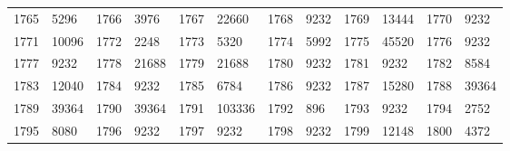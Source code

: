 \begin{longtable}{llllllllllll}
1765 & 5296&1766 &3976&1767& 22660&1768 &9232&1769 &13444&1770& 9232\\
1771 & 10096&1772 &2248&1773& 5320&1774 &5992&1775 &45520&1776& 9232\\
1777 & 9232&1778 &21688&1779& 21688&1780 &9232&1781 &9232&1782& 8584\\
1783 & 12040&1784 &9232&1785& 6784&1786 &9232&1787 &15280&1788& 39364\\
1789 & 39364&1790 &39364&1791& 103336&1792 &896&1793 &9232&1794& 2752\\
1795 & 8080&1796 &9232&1797& 9232&1798 &9232&1799 &12148&1800& 4372\\
\bottomrule\end{longtable}
